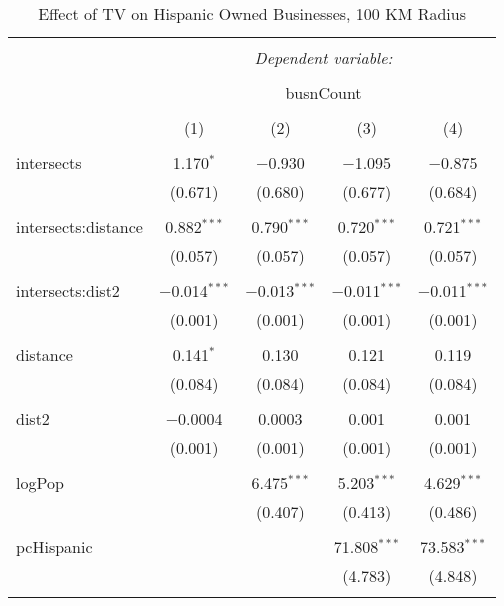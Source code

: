 
\begin{table}[!htbp] \centering 
  \caption{Effect of TV on Hispanic Owned Businesses, 100 KM Radius} 
  \label{} 
\begin{tabular}{@{\extracolsep{-5pt}}lcccc} 
\\[-1.8ex]\hline 
\hline \\[-1.8ex] 
 & \multicolumn{4}{c}{\textit{Dependent variable:}} \\ 
\cline{2-5} 
\\[-1.8ex] & \multicolumn{4}{c}{busnCount} \\ 
\\[-1.8ex] & (1) & (2) & (3) & (4)\\ 
\hline \\[-1.8ex] 
 intersects & 1.170$^{*}$ & $-$0.930 & $-$1.095 & $-$0.875 \\ 
  & (0.671) & (0.680) & (0.677) & (0.684) \\ 
  & & & & \\ 
 intersects:distance & 0.882$^{***}$ & 0.790$^{***}$ & 0.720$^{***}$ & 0.721$^{***}$ \\ 
  & (0.057) & (0.057) & (0.057) & (0.057) \\ 
  & & & & \\ 
 intersects:dist2 & $-$0.014$^{***}$ & $-$0.013$^{***}$ & $-$0.011$^{***}$ & $-$0.011$^{***}$ \\ 
  & (0.001) & (0.001) & (0.001) & (0.001) \\ 
  & & & & \\ 
 distance & 0.141$^{*}$ & 0.130 & 0.121 & 0.119 \\ 
  & (0.084) & (0.084) & (0.084) & (0.084) \\ 
  & & & & \\ 
 dist2 & $-$0.0004 & 0.0003 & 0.001 & 0.001 \\ 
  & (0.001) & (0.001) & (0.001) & (0.001) \\ 
  & & & & \\ 
 logPop &  & 6.475$^{***}$ & 5.203$^{***}$ & 4.629$^{***}$ \\ 
  &  & (0.407) & (0.413) & (0.486) \\ 
  & & & & \\ 
 pcHispanic &  &  & 71.808$^{***}$ & 73.583$^{***}$ \\ 
  &  &  & (4.783) & (4.848) \\ 
  & & & & \\ 

\end{tabular}
\end{table}
